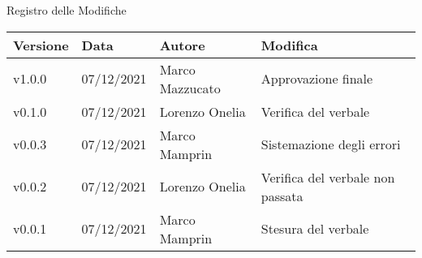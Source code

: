 \begin{center}
    \huge{Registro delle Modifiche}
  \end{center}

  \begin{center}
    \begin{tabular}{|p{2cm}|p{2cm}|p{4cm}|p{5cm}|}
      \hline
      \textbf{Versione} & \textbf{Data} & \textbf{Autore} & \textbf{Modifica}                    \\ \hline
      v1.0.0            & 07/12/2021    & Marco Mazzucato & Approvazione finale \\ \hline
      v0.1.0            & 07/12/2021    & Lorenzo Onelia  & Verifica del verbale \\ \hline
      v0.0.3            & 07/12/2021    & Marco Mamprin   & Sistemazione degli errori \\ \hline
      v0.0.2            & 07/12/2021    & Lorenzo Onelia  & Verifica del verbale non passata \\ \hline
      v0.0.1            & 07/12/2021    & Marco Mamprin   & Stesura del verbale \\ \hline
    \end{tabular}
  \end{center}
